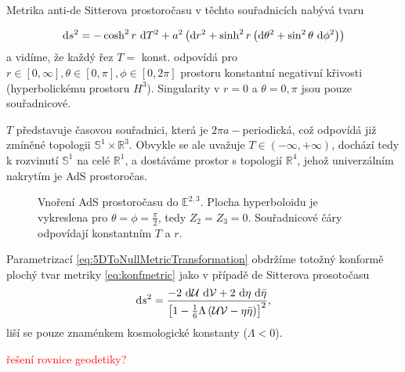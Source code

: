 Metrika anti-de Sitterova prostoročasu v těchto souřadnicích nabývá tvaru

\begin{equation}
     \mathrm{d} s^2 = - \cosh^2 r ~ \mathrm{d} T^2 + a^2 \left( \mathrm{d} r^2 + \sinh^2 r \left( \mathrm{d} \theta^2 + \sin^2 \theta ~ \mathrm{d} \phi^2 \right) \right)
\end{equation}
a vidíme, že každý řez $T =$ konst. odpovídá pro $r\in\left[0, \infty\right], \theta \in \left[0, \pi\right], \phi \in \left[0, 2\pi\right]$
prostoru konstantní negativní křivosti (hyperbolickému prostoru $H^3$).
Singularity v $r = 0$ a $\theta = 0, \pi$ jsou pouze souřadnicové.

$T$ představuje časovou souřadnici, která je $2 \pi a-$periodická, což odpovídá již zmíněné topologii $\mathbb{S}^1 \times \mathbb{R}^3$.
Obvykle se ale uvažuje $T \in \left(-\infty, +\infty\right)$, dochází tedy k rozvinutí $\mathbb{S}^1$ na celé $\mathbb{R}^1$, a dostáváme
prostor s topologií $\mathbb{R}^4$, jehož univerzálním nakrytím je AdS prostoročas.


\begin{figure}[H]
     \centering
     \caption{Vnoření AdS prostoročasu do $\mathbb{E}^{2,3}$. Plocha hyperboloidu je vykreslena pro $\theta=\phi=\frac{\pi}{2}$, tedy $Z_2 = Z_3 = 0$. Souřadnicové čáry odpovídají konstantním $T$ a $r$.}
\end{figure}

Parametrizací \eqref{eq:5DToNullMetricTransformation} obdržíme totožný konformě plochý tvar metriky \eqref{eq:konfmetric} jako
v případě de Sitterova prosotočasu
\begin{equation*}
     \mathrm{d} s^2 = \frac{-2 ~ \mathrm{d} \mathcal{U} ~ \mathrm{d} \mathcal{V} + 2 ~ \mathrm{d} \eta ~ \mathrm{d} \bar{\eta}}{\left[1-\tfrac{1}{6} \Lambda \left(\mathcal{U} \mathcal{V} - \eta \bar{\eta}\right)\right]^2},
\end{equation*}
liší se pouze znaménkem kosmologické konstanty ($\Lambda<0$).

\textcolor{red}{řešení rovnice geodetiky?}